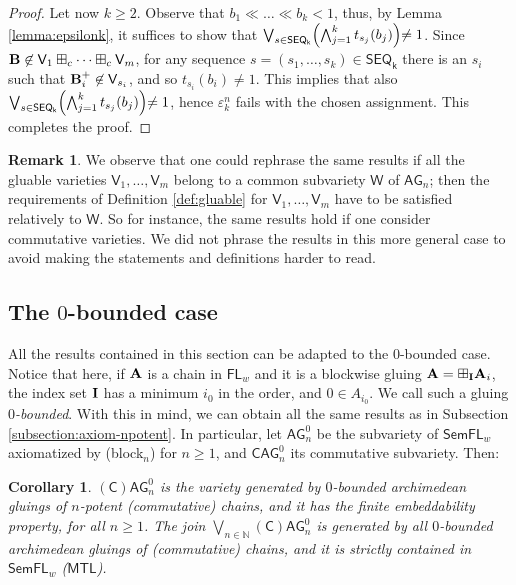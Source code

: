 \documentclass{amsart}
\newtheorem{corollary}[theorem]{Corollary}
\theoremstyle{definition}
\newtheorem{remark}[theorem]{Remark}
\numberwithin{equation}{section}
\newcommand{\alg}[1]{{\textbf{\upshape #1}}}  %
\newcommand{\vv}[1]{\mathsf {#1}}
\newcommand{\FL}{\vv F\vv L}
\newcommand{\BG}{\vv{AG}}
\begin{document}
\begin{proof}
Let now $k \geq 2$. Observe that $b_1 \ll \dots \ll b_k <1$, thus, by Lemma \ref{lemma:epsilonk}, it suffices to show that $\bigvee_{s \in \vv{SEQ_k}}\Bigl (\bigwedge_{j=1}^k t_{s_j}(b_j) \Bigl ) \neq 1$. Since $\alg B \not \in \vv V_1 \boxplus_c \dots \boxplus_c \vv V_m$, for any sequence $s=(s_1, \dots , s_k) \in \vv{SEQ_k}$ there is an $s_i$ such that $\alg B_i^+ \not \in \vv V_{s_i}$, and so $t_{s_i}(b_i)\neq 1$. This implies that also $\bigvee_{s \in \vv{SEQ_k}}\Bigl (\bigwedge_{j=1}^k t_{s_j}(b_j) \Bigl ) \neq 1$, hence $\varepsilon_k^n$ fails with the chosen assignment. 
This completes the proof. 
\end{proof}
\begin{remark}
	We observe that one could rephrase the same results if all the gluable varieties $\vv V_1, \ldots, \vv V_m$ belong to a common subvariety $\vv W$ of $\BG_n$; then the requirements of Definition \ref{def:gluable} for $\vv V_1, \ldots, \vv V_m$ have to be satisfied relatively to $\vv W$. So for instance, the same results hold if one consider commutative varieties. We did not phrase the results in this more general case to avoid making the statements and definitions harder to read.
\end{remark}
\subsection{The $0$-bounded case}
All the results contained in this section can be adapted to the $0$-bounded case. Notice that here, if $\alg A$ is a chain in $\FL_w$ and it is a blockwise gluing $\alg A = \boxplus_{\bf I} \alg A_i$, the index set $\bf I$ has a minimum $i_0$ in the order, and $0 \in A_{i_0}$. We call such a gluing {\em $0$-bounded}. With this in mind, we can obtain all the same results as in Subsection \ref{subsection:axiom-npotent}. In particular, let $\BG_n^0$ be the subvariety of $\vv{SemFL}_w$ axiomatized by (block$_n$) for $n \geq 1$, and $\vv{C}\BG_n^0$ its commutative subvariety. Then:
\begin{corollary}
	$(\vv C)\BG_n^0$ is the variety generated by $0$-bounded archimedean gluings of $n$-potent (commutative) chains, and it has the finite embeddability property, for all $n \geq 1$.
	The join $\bigvee_{n \in \mathbb{N}} (\vv C)\BG_n^0$ is generated by all $0$-bounded archimedean gluings of (commutative) chains, and it is strictly contained in $\vv{SemFL}_w$ ($\vv{MTL}$).
\end{corollary}
\end{document}
